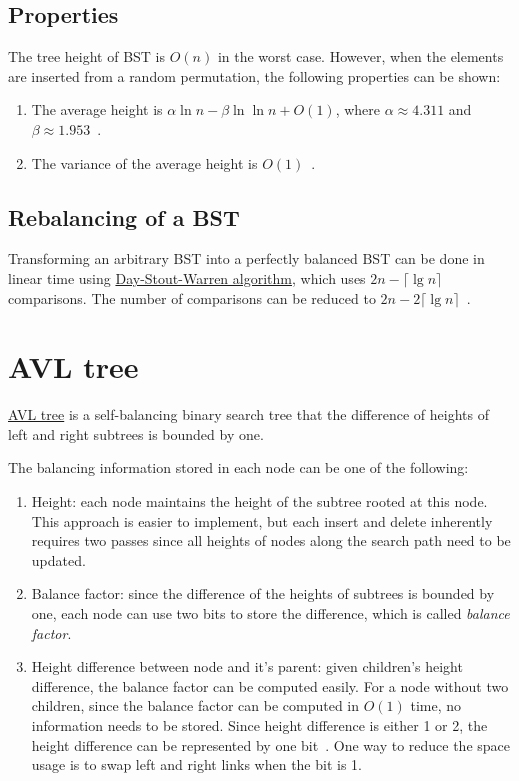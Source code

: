 \subsection{Properties}
The tree height of BST is $O(n)$ in the worst case. However, when the elements are inserted from a random permutation, the following properties can be shown:
\begin{enumerate}
    \item The average height is $\alpha \ln n - \beta \ln \ln n + O(1)$, where $\alpha \approx 4.311$ and $\beta \approx 1.953$~\cite{Reed2003}.
    \item The variance of the average height is $O(1)$~\cite{Drmota2003}.
\end{enumerate}

\subsection{Rebalancing of a BST}
Transforming an arbitrary BST into a perfectly balanced BST can be done in linear time using 
\href{https://en.wikipedia.org/wiki/Day%E2%80%93Stout%E2%80%93Warren_algorithm}
{Day-Stout-Warren algorithm}, which uses $2n - \lceil \lg n \rceil$ comparisons. The number of comparisons can be reduced to $2n - 2 \lceil \lg n \rceil$~\cite{Luccio2016}.

\section{AVL tree}
\href{https://en.wikipedia.org/wiki/AVL_tree}{AVL tree} is a self-balancing binary search tree that the difference of heights of left and right subtrees is bounded by one.

The balancing information stored in each node can be one of the following:
\begin{enumerate}
    \item Height: each node maintains the height of the subtree rooted at this node. This approach is easier to implement, but each insert and delete inherently requires two passes since all heights of nodes along the search path need to be updated.
    \item Balance factor: since the difference of the heights of subtrees is bounded by one, each node can use two bits to store the difference, which is called \emph{balance factor}. 
    \item Height difference between node and it's parent: given children's height difference, the balance factor can be computed easily. For a node without two children, since the balance factor can be computed in $O(1)$ time, no information needs to be stored. Since height difference is either 1 or 2, the height difference can be represented by one bit~\cite{Brown1978}. One way to reduce the space usage is to swap left and right links when the bit is 1.
\end{enumerate}

